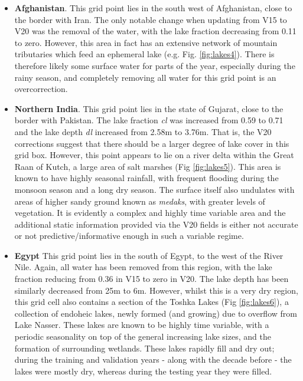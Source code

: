 \documentclass[twocolumn]{article}
\begin{document}
\begin{itemize}
	\item \textbf{Afghanistan}. This grid point lies in the south west of Afghanistan, close to the border with Iran. The only notable change when updating from V15 to V20 was the removal of the water, with the lake fraction decreasing from 0.11 to zero. However, this area in fact has an extensive network of mountain tributaries which feed an ephemeral lake (e.g. Fig. \ref{fig:lakes4}). There is therefore likely some surface water for parts of the year, especially during the rainy season, and completely removing all water for this grid point  is an overcorrection.
	
	\item \textbf{Northern India}. This grid point lies in the state of Gujarat, close to the border with Pakistan. The lake fraction \textit{cl} was increased from 0.59 to 0.71 and the lake depth \textit{dl} increased from 2.58m to 3.76m. That is, the V20 corrections suggest that there should be a larger degree of lake cover in this grid box. However, this point appears to lie on a river delta within the Great Raan of Kutch, a large area of salt marshes (Fig \ref{fig:lakes5}). This area is known to have highly seasonal rainfall, with frequent flooding during the monsoon season and a long dry season. The surface itself also undulates with areas of higher sandy ground known as \textit{medaks}, with greater levels of vegetation. It is evidently a complex and highly time variable area and the additional static information provided via the V20 fields is either not accurate or not predictive/informative enough in such a variable regime.
	
	\item \textbf{Egypt} This grid point lies in the south of Egypt, to the west of the River Nile. Again, all water has been removed from this region, with the lake fraction reducing from 0.36 in V15 to zero in V20. The lake depth has been similarly decreased from 25m to 6m. However, whilst this is a very dry region, this grid cell also contains a section of the Toshka Lakes (Fig \ref{fig:lakes6}), a collection of endoheic lakes, newly formed (and growing) due to overflow from Lake Nasser. These lakes are known to be highly time variable, with a periodic seasonality on top of the general increasing lake sizes, and the formation of surrounding wetlands. These lakes rapidly fill and dry out; during the training and validation years -  along with the decade before - the lakes were mostly dry\cite{ToshkaURL}, whereas during the testing year they were filled.
\end{itemize}
\end{document}
